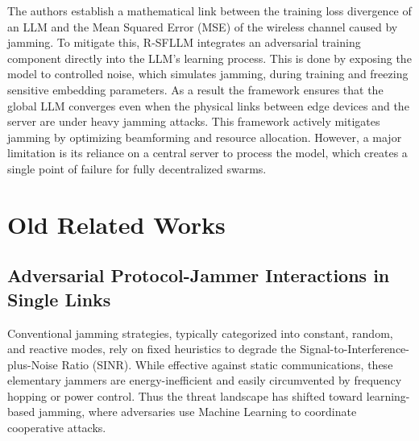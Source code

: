 \documentclass[conference]{IEEEtran}
\newcommand{\adm}[1]{{\color{orange}{[#1]}}}
\begin{document}
The authors establish a mathematical link between the training loss divergence of an LLM and the Mean Squared Error (MSE) of the wireless channel caused by jamming.
\adm{the use case is a bit forced: app-layer problems and phy-layer problems can be disentangled and tackled separately}
To mitigate this, R-SFLLM integrates an adversarial training component directly into the LLM's learning process. 
This is done by exposing the model to controlled noise, which simulates jamming, during training and freezing sensitive embedding parameters. 
As a result the framework ensures that the global LLM converges \adm{i guess they are trying to train an LLM in a federated style? it is out of scope for this work} even when the physical links between edge devices and the server are under heavy jamming attacks.
\adm{this method focuses on an application. we want a method to mitigate jamming, not to propose a jamming-resilient application. it might be an interesting RQ but out of scope because we focus on jamming mitigation}
This framework actively mitigates jamming by optimizing beamforming and resource allocation. \adm{we can also use such guiding principles, but application-agnostic. i.e., LLM can be used as system optimizers and not as application (can be anything)}
However, a major limitation is its reliance on a central server to process the model, which creates a single point of failure for fully decentralized swarms.

\section{Old Related Works}
\subsection{Adversarial Protocol-Jammer Interactions in Single Links}
Conventional jamming strategies, typically categorized into constant, random, and reactive modes, rely on fixed heuristics to degrade the Signal-to-Interference-plus-Noise Ratio (SINR). 
While effective against static communications, these elementary jammers are energy-inefficient and easily circumvented by frequency hopping or power control. 
Thus the threat landscape has shifted toward learning-based jamming, where adversaries use Machine Learning to coordinate cooperative attacks.~
\end{document}

